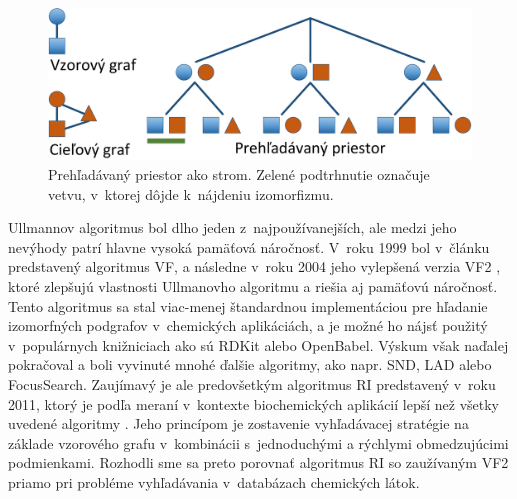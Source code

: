 \documentclass[slovak]{ExcelAtFIT} %
\begin{document}
\begin{figure}[!htb]
	\centering
	\includegraphics[width=1\linewidth]{images/ss_search_tree.pdf}
	\caption{Prehľadávaný priestor ako strom. Zelené podtrhnutie označuje vetvu, v~ktorej dôjde k~nájdeniu izomorfizmu. \cite{ri}}
	\label{fig:search_space_tree}
\end{figure}

Ullmannov algoritmus bol dlho jeden z~naj\-po\-uží\-va\-nej\-ších, ale medzi jeho nevýhody patrí hlavne vysoká pamäťová náročnosť. V~roku 1999 bol v~článku \cite{vf} predstavený algoritmus VF, a následne v~roku 2004 jeho vylepšená verzia VF2 \cite{vf2}, ktoré zlepšujú vlastnosti Ullmanovho algoritmu a riešia aj pamäťovú náročnosť. Tento algoritmus sa stal viac-menej štan\-dard\-nou implementáciou pre hľadanie izomorfných podgrafov v~chemických aplikáciách, a je možné ho nájsť použitý v~populárnych knižniciach ako sú RDKit alebo OpenBabel. Výskum však naďalej pokračoval a boli vyvinuté mnohé ďalšie algoritmy, ako napr. SND, LAD alebo FocusSearch. Zaujímavý je ale predovšetkým algoritmus RI predstavený v~roku 2011, ktorý je podľa meraní v~kontexte biochemických aplikácií lepší než všetky uvedené algoritmy \cite{ri}. Jeho princípom je zostavenie vyhľadávacej stratégie na zá\-kla\-de vzorového grafu v~kombinácii s~jednoduchými a rýchlymi obmedzujúcimi podmienkami. Rozhodli sme sa preto porovnať algoritmus RI so zaužívaným VF2 priamo pri probléme vyhľadávania v~databázach chemických látok.
\end{document}
